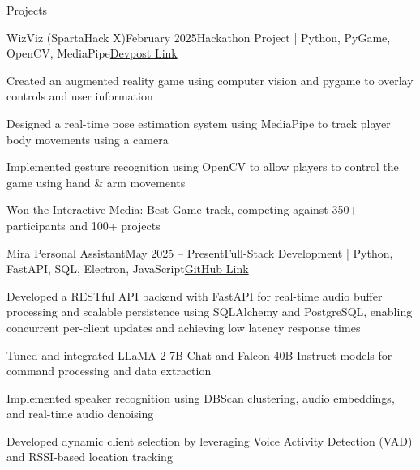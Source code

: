 \documentclass[
	11pt
]{resume}
\begin{document}
	\begin{rSection}{Projects}
		\begin{rSectionEntry}{WizViz (SpartaHack X)}{February 2025}{Hackathon Project | Python, PyGame, OpenCV, MediaPipe}{\href{https://devpost.com/software/wizviz}{Devpost Link}}
			\item Created an augmented reality game using computer vision and pygame to overlay controls and user information
			\item Designed a real-time pose estimation system using MediaPipe to track player body movements using a camera
			\item Implemented gesture recognition using OpenCV to allow players to control the game using hand \& arm movements
			\item Won the Interactive Media: Best Game track, competing against 350+ participants and 100+ projects
		\end{rSectionEntry}

		\begin{rSectionEntry}{Mira Personal Assistant}{May 2025 -- Present}{Full-Stack Development | Python, FastAPI, SQL, Electron, JavaScript}{\href{https://github.com/mira-assistant}{GitHub Link}}
			\item Developed a RESTful API backend with FastAPI for real-time audio buffer processing and scalable persistence using SQLAlchemy and PostgreSQL, enabling concurrent per-client updates and achieving low latency response times
			\item Tuned and integrated LLaMA-2-7B-Chat and Falcon-40B-Instruct models for command processing and data extraction
			\item Implemented speaker recognition using DBScan clustering, audio embeddings, and real-time audio denoising
			\item Developed dynamic client selection by leveraging Voice Activity Detection (VAD) and RSSI-based location tracking
		\end{rSectionEntry}
	\end{rSection}
\end{document}
